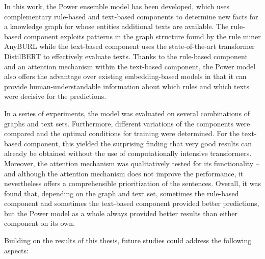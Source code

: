 In this work, the Power ensemble model has been developed, which uses complementary rule-based and text-based components to determine new facts for a knowledge graph for whose entities additional texts are available. The rule-based component exploits patterns in the graph structure found by the rule miner AnyBURL while the text-based component uses the state-of-the-art transformer DistilBERT to effectively evaluate texts. Thanks to the rule-based component and an attention mechanism within the text-based component, the Power model also offers the advantage over existing embedding-based models in that it can provide human-understandable information about which rules and which texts were decisive for the predictions.

In a series of experiments, the model was evaluated on several combinations of graphs and text sets. Furthermore, different variations of the components were compared and the optimal conditions for training were determined. For the text-based component, this yielded the surprising finding that very good results can already be obtained without the use of computationally intensive transformers. Moreover, the attention mechanism was qualitatively tested for its functionality -- and although the attention mechanism does not improve the performance, it nevertheless offers a comprehensible prioritization of the sentences. Overall, it was found that, depending on the graph and text set, sometimes the rule-based component and sometimes the text-based component provided better predictions, but the Power model as a whole always provided better results than either component on its own.

Building on the results of this thesis, future studies could address the following aspects:

